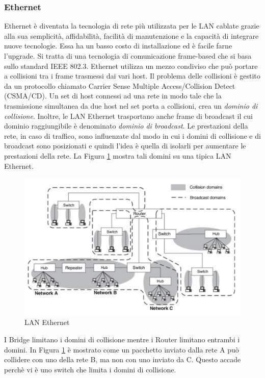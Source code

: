 \subsubsection{Ethernet}
Ethernet è diventata la tecnologia di rete più utilizzata per le LAN cablate grazie alla sua semplicità, affidabilità, facilità di manutenzione e la capacità di integrare nuove tecnologie. Essa ha un basso costo di installazione ed è facile farne l'upgrade. Si tratta di una tecnologia di comunicazione frame-based che si basa sullo standard IEEE 802.3. Ethernet utilizza un mezzo condiviso che può portare a collisioni tra i frame trasmessi dai vari host. Il problema delle collisioni è gestito da un protocollo chiamato Carrier Sense Multiple Access/Collision Detect (CSMA/CD). Un set di host connessi ad una rete in modo tale che la trasmissione simultanea da due host nel set porta a collisioni, crea un \emph{dominio di collisione}. Inoltre, le LAN Ethernet trasportano anche frame di broadcast il cui dominio raggiungibile è denominato \emph{dominio di broadcast}. Le prestazioni della rete, in caso di traffico, sono influenzate dal modo in cui i domini di collisione e di broadcast sono posizionati e quindi l'idea è quella di isolarli per aumentare le prestazioni della rete. La Figura \ref{fig:lan} mostra tali domini su una tipica LAN Ethernet.\newpage
\begin{figure}[h]
	\centering
	\includegraphics[scale=0.340]{imgs/lan.png}
	\caption{LAN Ethernet} \label{fig:lan}
\end{figure}
I Bridge limitano i domini di collisione mentre i Router limitano entrambi i domini. In Figura \ref{fig:lan} è mostrato come un pacchetto inviato dalla rete A può collidere con uno della rete B, ma non con uno inviato da C. Questo accade perchè vi è uno switch che limita i domini di collisione.

